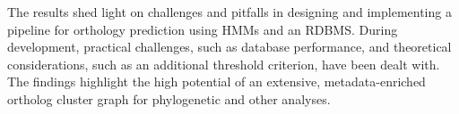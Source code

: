 The results shed light on challenges and pitfalls in designing and implementing
a pipeline for orthology prediction using HMMs and an RDBMS. During development,
practical challenges, such as database performance, and theoretical
considerations, such as an additional threshold criterion, have been dealt with.
The findings highlight the high potential of an extensive, metadata-enriched
ortholog cluster graph for phylogenetic and other analyses. 

